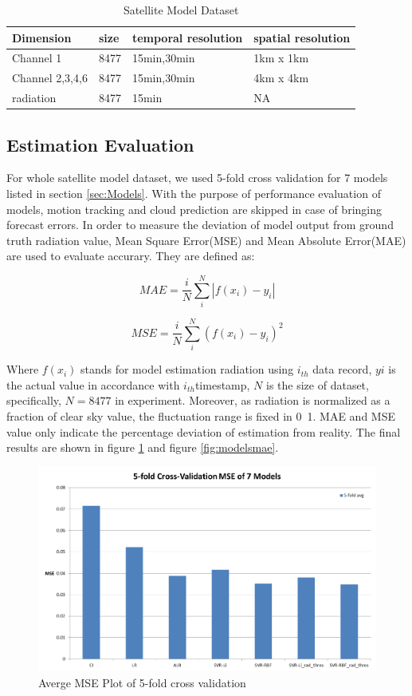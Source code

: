 \documentclass[conference]{IEEEtran}
\begin{document}
\begin{table}[htb]
\caption{Satellite Model Dataset}
\centering
\label{tab:dataset}
    \begin{tabular}{   l  |  l  |  l  | l }
    \hline
   Dimension	&size	&temporal resolution	&spatial resolution  \\ \hline
   Channel 1	&8477   &15min,30min			&1km x 1km    \\ \hline
   Channel 2,3,4,6	&8477   &15min,30min		&4km x 4km    \\ \hline
   radiation	&8477   &15min			&NA    \\ \hline 
   \hline
    \end{tabular}
\end{table}


\subsection{Estimation Evaluation}
\label{subsec:esti_e}

For whole satellite model dataset, we used 5-fold cross validation for 7 models
listed in section \ref{sec:Models}. With the purpose of performance evaluation
of models, motion tracking and cloud prediction are skipped in case of
bringing forecast errors. In order to measure the deviation of model output from
ground truth radiation value, Mean Square Error(MSE) and Mean Absolute
Error(MAE) are used to evaluate accurary. They are defined
as:

\begin{equation}
\label{eq:MAE}
MAE=\frac{i}{N} \sum_{i}^{N}\left | f(x_i) - y_i \right |
\end{equation}

\begin{equation}
\label{eq:MSE}
MSE=\frac{i}{N} \sum_{i}^{N}{(f(x_i) - y_i)^{2}}
\end{equation}

Where $f(x_i)$ stands for model estimation radiation using $i_{th}$ data record,
$yi$ is the actual value in accordance with $i_{th}$timestamp, $N$ is the size
of dataset, specifically, $N = 8477$ in experiment. 
Moreover, as radiation is normalized as a fraction of clear sky value, the
fluctuation range is fixed in 0~1. MAE and MSE value only indicate the
percentage deviation of estimation from reality. The final results are shown in
figure \ref{fig:modelsmse} and figure \ref{fig:modelsmae}.


\begin{figure}[h]
\label{fig:modelsmse}
\centering
\includegraphics[width=3 in]{modelsmse}
\caption{Averge MSE Plot of 5-fold cross validation}
\end{figure}
\end{document}
